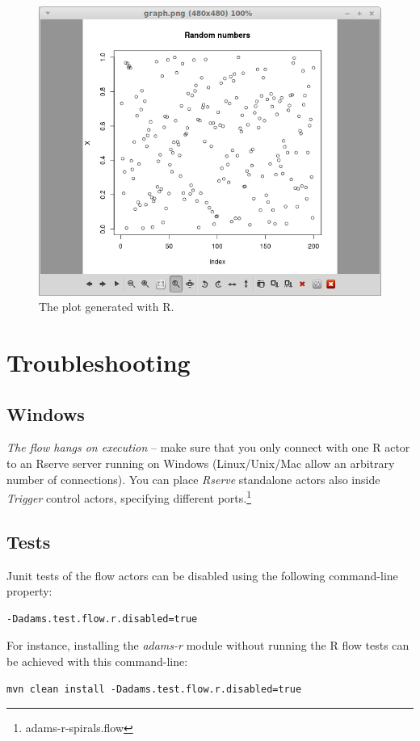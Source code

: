 \documentclass[a4paper]{book}
\begin{document}
\begin{figure}[ht]
	\centering
	\includegraphics[width=\textwidth]{images/sink-output.png}
	\caption{The plot generated with R.}
	\label{sink-output}
\end{figure}

\chapter{Troubleshooting}
\section{Windows}
\textit{The flow hangs on execution} -- make sure that you only connect 
with one R actor to an Rserve server running on Windows (Linux/Unix/Mac 
allow an arbitrary number of connections). You can place 
\textit{Rserve} standalone actors also inside \textit{Trigger} control 
actors, specifying different ports.\footnote{adams-r-spirals.flow}

\section{Tests}
Junit tests of the flow actors can be disabled using the following command-line 
property:
\begin{verbatim}
-Dadams.test.flow.r.disabled=true
\end{verbatim}
For instance, installing the \textit{adams-r} module without running the R 
flow tests can be achieved with this command-line:
\begin{verbatim}
mvn clean install -Dadams.test.flow.r.disabled=true
\end{verbatim}


\end{document}
